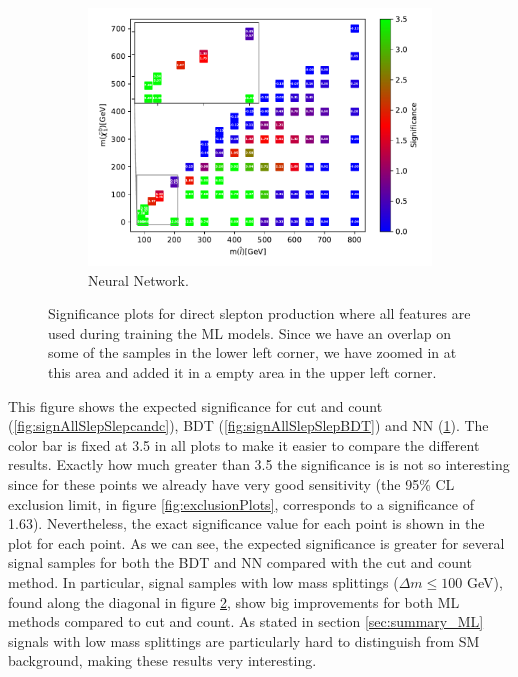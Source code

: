 \begin{figure}[H]
    \begin{subfigure}[t!]{0.49\textwidth}
    \includegraphics[width = \textwidth]{Figures/Significances/significance_NN_slepslep_All_level.pdf}
    \caption{Neural Network.}
        \label{fig:signAllSlepSlepNN}
    \end{subfigure}
    \caption{Significance plots for direct slepton production where all features are used during training the ML models. Since we have an overlap on some of the samples in the lower left corner, we have zoomed in at this area and added it in a empty area in the upper left corner.}
    \label{fig:signAllSlepSlep}
\end{figure}

This figure shows the expected significance for cut and count (\ref{fig:signAllSlepSlepcandc}), BDT (\ref{fig:signAllSlepSlepBDT}) and NN (\ref{fig:signAllSlepSlepNN}). The color bar is fixed at 3.5 in all plots to make it easier to compare the different results. Exactly how much greater than 3.5 the significance is is not so interesting since for these points we already have very good sensitivity (the 95\% CL exclusion limit, in figure \ref{fig:exclusionPlots}, corresponds to a significance of 1.63). Nevertheless, the exact significance value for each point is shown in the plot for each point. As we can see, the expected significance is greater for several signal samples for both the BDT and NN compared with the cut and count method. In particular, signal samples with low mass splittings ($\Delta m \leq 100$ GeV), found along the diagonal in figure \ref{fig:signAllSlepSlep}, show big improvements for both ML methods compared to cut and count. As stated in section \ref{sec:summary_ML} signals with low mass splittings are particularly hard to distinguish from SM background, making these results very interesting.












